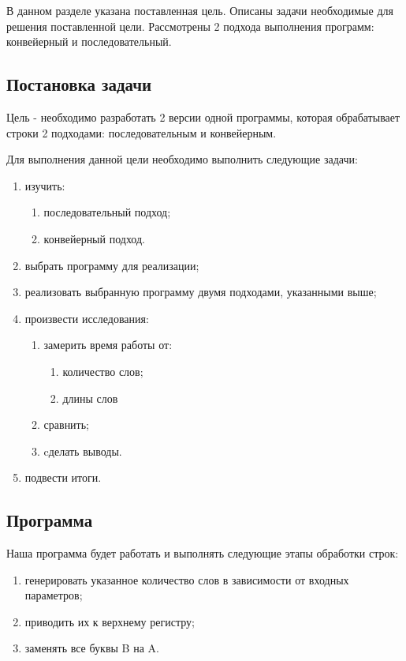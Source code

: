 \documentclass[../main.tex]{subfiles}
\begin{document}
	
	В данном разделе указана поставленная цель. Описаны задачи необходимые для решения поставленной цели. Рассмотрены 2 подхода выполнения программ: конвейерный и последовательный.
	
\subsection{Постановка задачи}
	
	Цель - необходимо разработать 2 версии одной программы, которая обрабатывает строки 2 подходами: последовательным и конвейерным.
	
	Для выполнения данной цели необходимо выполнить следующие задачи:
	\begin{enumerate}[1)]
		\item изучить:
		\begin{enumerate}
			\item последовательный подход;
			\item конвейерный подход.
		\end{enumerate}
		\item выбрать программу для реализации;
		\item реализовать выбранную программу двумя подходами, указанными выше;
		\item произвести исследования:
		\begin{enumerate}
			\item замерить время работы от:
				\begin{enumerate}
					\item количество слов;
					\item длины слов
				\end{enumerate}
			\item сравнить;
			\item cделать выводы.
		\end{enumerate}
		\item подвести итоги.
	\end{enumerate}

\subsection{Программа}

	Наша программа будет работать и выполнять следующие этапы обработки строк:
	
	\begin{enumerate}[1)]
		\item генерировать указанное количество слов в зависимости от входных параметров;
		\item приводить их к верхнему регистру;
		\item заменять все буквы B на A.
	\end{enumerate}
	
\end{document}
